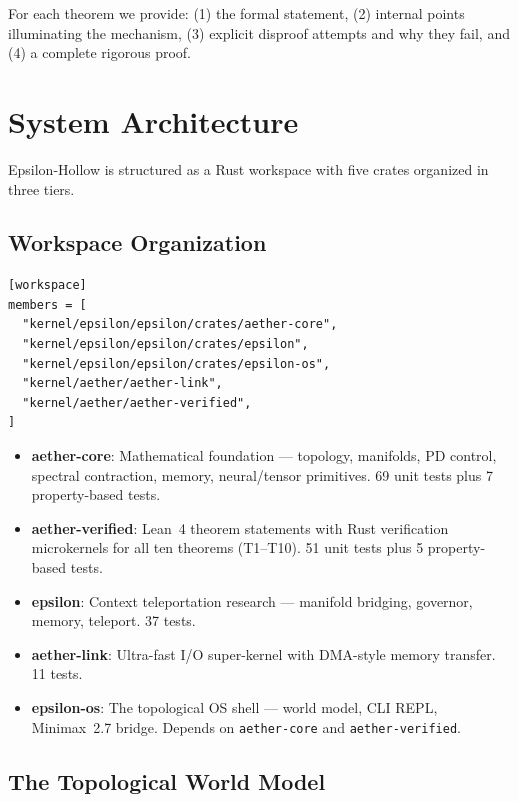 \documentclass[11pt, a4paper]{article}
\theoremstyle{proofform}
\numberwithin{innerpoints}{subsection}
\numberwithin{disproof}{subsection}
\theoremstyle{mathproof}
\begin{document}
For each theorem we provide: (1) the formal statement, (2) internal points illuminating the mechanism, (3) explicit disproof attempts and why they fail, and (4) a complete rigorous proof.

\section{System Architecture}
\label{sec:architecture}

Epsilon-Hollow is structured as a Rust workspace with five crates organized in three tiers.

\subsection{Workspace Organization}

\begin{lstlisting}[caption={Cargo workspace members}]
[workspace]
members = [
  "kernel/epsilon/epsilon/crates/aether-core",
  "kernel/epsilon/epsilon/crates/epsilon",
  "kernel/epsilon/epsilon/crates/epsilon-os",
  "kernel/aether/aether-link",
  "kernel/aether/aether-verified",
]
\end{lstlisting}

\begin{itemize}[nosep]
  \item \textbf{aether-core}: Mathematical foundation --- topology, manifolds, PD control, spectral contraction, memory, neural/tensor primitives. 69 unit tests plus 7 property-based tests.
  \item \textbf{aether-verified}: Lean~4 theorem statements with Rust verification microkernels for all ten theorems (T1--T10). 51 unit tests plus 5 property-based tests.
  \item \textbf{epsilon}: Context teleportation research --- manifold bridging, governor, memory, teleport. 37 tests.
  \item \textbf{aether-link}: Ultra-fast I/O super-kernel with DMA-style memory transfer. 11 tests.
  \item \textbf{epsilon-os}: The topological OS shell --- world model, CLI REPL, Minimax~2.7 bridge. Depends on \texttt{aether-core} and \texttt{aether-verified}.
\end{itemize}

\subsection{The Topological World Model}
\end{document}
